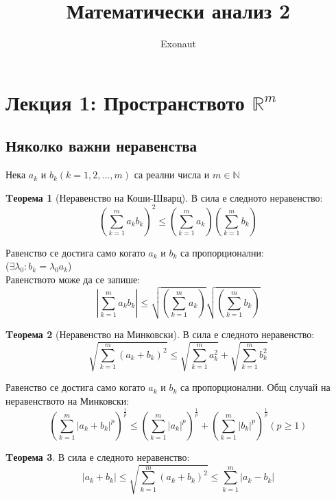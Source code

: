 \documentclass[a4paper,fleqn,12pt]{article}
\title{Математически анализ 2}
\author{Exonaut}
\theoremstyle{definition}
\newtheorem{theorem}{Tеорема}[subsection]
\begin{document}
\maketitle

\newpage
{}

\tableofcontents
\newpage

\section{Лекция 1: Пространството $\mathbb{R}^m$}

\subsection{Няколко важни неравенства}
Нека $a_k $ и $b_k (k = 1, 2, ..., m) $ са реални числа и $m \in \mathbb{N}$
\begin{theorem}[Неравенство на Коши-Шварц]
В сила е следното неравенство: \\
$$\left( \sum_{k=1}^{m}a_kb_k \right ) ^ 2   \leq  \left( \sum_{k=1}^{m}a_k \right)  \left( \sum_{k=1}^{m}b_k  \right) $$
\end{theorem}
Равенство се достига само когато $a_k$ и $b_k$ са пропорционални:\\
 ($\exists \lambda_0: b_k =\lambda_0 a_k  $)\\
Равенството може да се запише: 
$$\displaystyle\left\lvert \sum_{k=1}^{m}a_kb_k \right \rvert \leq \sqrt{\left( \sum_{k=1}^{m}a_k \right)}  \sqrt{ \left( \sum_{k=1}^{m}b_k  \right)} $$

\begin{theorem}[Неравенство на Минковски]
В сила е следното неравенство: \\
$$\sqrt{ \sum_{k=1}^{m} (a_k + b_k)^2}   \leq \sqrt{ \sum_{k=1}^{m}a_k^2 } + \sqrt{ \sum_{k=1}^{m}b_k^2 }$$
\end{theorem}
Равенство се достига само когато $a_k$ и $b_k$ са пропорционални.
Общ случай на неравенството на Минковски:
$$\left ( \sum_{k=1}^{m} \vert a_k + b_k\vert ^p \right)^\frac{1}{p}   \leq\left ( \sum_{k=1}^{m}\vert a_k\vert ^p\right)^\frac{1}{p} + \left ( \sum_{k=1}^{m} \vert b_k\vert ^p \right)^\frac{1}{p}   ( p\geq 1)$$

\begin{theorem}
В сила е следното неравенство: \\
$$ \vert a_k + b_k\vert   \leq \sqrt{ \sum_{k=1}^{m} (a_k + b_k)^2} \leq   \sum_{k=1}^{m}\vert a_k - b_k\vert  $$
\end{theorem}
\end{document}
